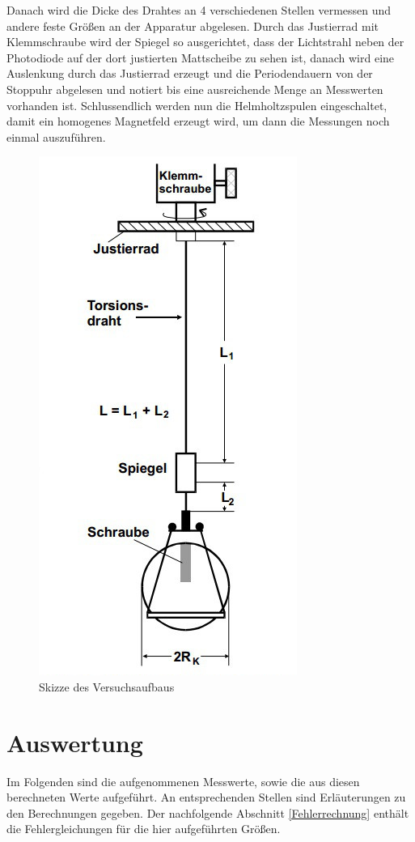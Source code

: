     Danach wird die Dicke des Drahtes an 4 verschiedenen Stellen vermessen und 
    andere feste Größen an der Apparatur abgelesen.
    Durch das Justierrad mit Klemmschraube wird der Spiegel so ausgerichtet, dass der 
    Lichtstrahl neben der Photodiode auf der dort justierten Mattscheibe zu sehen ist, danach wird 
    eine Auslenkung durch das Justierrad erzeugt und die Periodendauern von der Stoppuhr abgelesen und notiert bis 
    eine ausreichende Menge an Messwerten vorhanden ist.  
    Schlussendlich werden nun die Helmholtzspulen eingeschaltet, damit ein homogenes 
    Magnetfeld erzeugt wird, um dann die Messungen noch einmal auszuführen.
    \begin{figure}[b]
          \centering
          \includegraphics*[scale = 0.75]{Grafik/Versuchsaufbau.jpg}%
          \caption{Skizze des Versuchsaufbaus}
          \label{Aufbau}%
    \end{figure}    


  \section{Auswertung}
    \label{Auswertung}
    Im Folgenden sind die aufgenommenen Messwerte, sowie die aus diesen berechneten Werte
    aufgeführt. An entsprechenden Stellen sind Erläuterungen zu den Berechnungen gegeben.
    Der nachfolgende Abschnitt \ref{Fehlerrechnung} enthält die Fehlergleichungen für die hier
    aufgeführten Größen.
    
